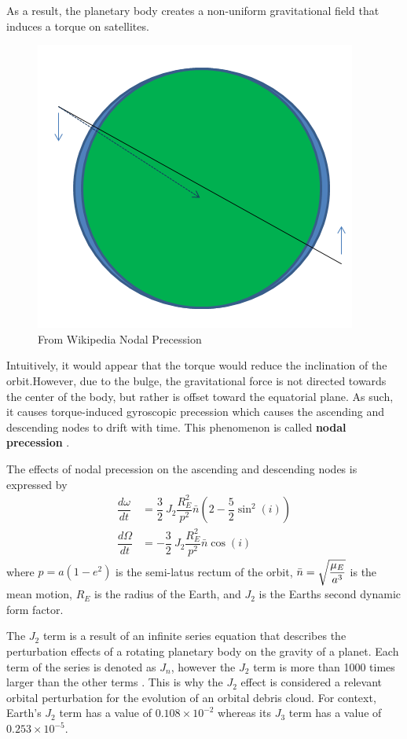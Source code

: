\documentclass[a4paper, 12pt]{article}
\newcommand{\lindex}[1]{%
	\lowercase{\def\temp{#1}}%
	\expandafter\index\expandafter{\temp}%
}
\newcommand{\boldindex}[1]{%
	\textbf{#1}\lindex{#1}%
}
\begin{document}
As a result, the planetary body creates a non-uniform gravitational field that induces a torque on satellites. 

\begin{figure}[h]
	\centering
	\includegraphics[scale=0.4]{Nodal_precession}
	\caption{From Wikipedia Nodal Precession}
\end{figure}

Intuitively, it would appear that the torque would reduce the inclination of the orbit.However, due to the bulge, the gravitational force is not directed towards the center of the body, but rather is offset toward the equatorial plane. As such, it causes torque-induced gyroscopic precession which causes the ascending and descending nodes to drift with time. This phenomenon is called \boldindex{nodal precession}.

The effects of nodal precession on the ascending and descending nodes is expressed by
\begin{align*}
	\dfrac{d\omega}{dt} &= \dfrac{3}{2}\:J_2\dfrac{R_E^2}{p^2}\bar{n}\left(2 - \dfrac{5}{2}\sin^2(i)\right)\\
	\dfrac{d\Omega}{dt} &= -\dfrac{3}{2}\:J_2\dfrac{R_E^2}{p^2}\bar{n}\cos(i)
\end{align*}
where $p = a(1 - e^2)$ is the semi-latus rectum of the orbit, $\bar{n}=\sqrt{\mathstrut\dfrac{\mu_E}{a^3}}$ is the mean motion, $R_E$ is the radius of the Earth, and $J_2$ is the Earths second dynamic form factor.

The $J_2$ term is a result of an infinite series equation that describes the perturbation effects of a rotating planetary body on the gravity of a planet. Each term of the series is denoted as $J_n$, however the $J_2$ term is more than 1000 times larger than the other terms \citep{J2Pertur39:online}. This is why the $J_2$ effect is considered a relevant orbital perturbation for the evolution of an orbital debris cloud. For context, Earth's  $J_2$ term has a value of $0.108 \times 10^{-2}$ whereas its $J_3$ term has a value of $0.253 \times 10^{-5}$.
\end{document}
